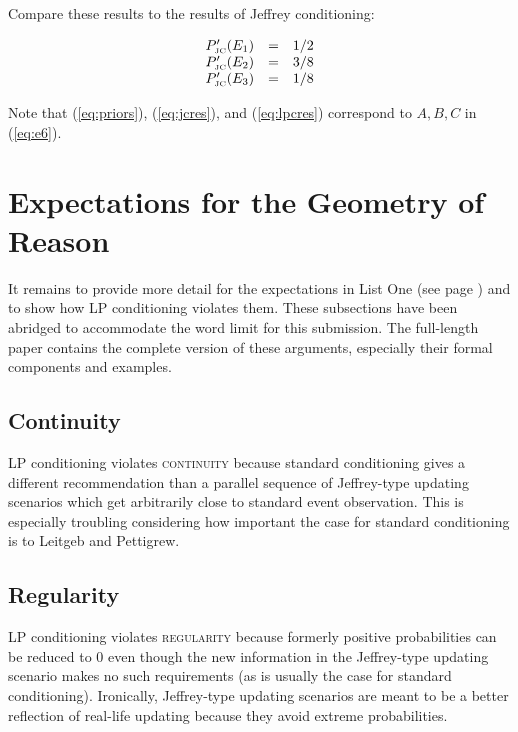 \documentclass[11pt]{article}
\begin{document}
Compare these results to the results of Jeffrey conditioning:

\begin{equation}
  \label{eq:jcres}
  \begin{array}{rcl}
    P'_{\mbox{\tiny JC}}(E_{1})&=&1/2 \\
    P'_{\mbox{\tiny JC}}(E_{2})&=&3/8 \\
    P'_{\mbox{\tiny JC}}(E_{3})&=&1/8
  \end{array}
\end{equation}

Note that (\ref{eq:priors}), (\ref{eq:jcres}), and (\ref{eq:lpcres})
correspond to $A,B,C$ in (\ref{eq:e6}).

\section{Expectations for the Geometry of Reason}
\label{fivex}

It remains to provide more detail for the expectations in List One
(see page \pageref{page:listone}) and to show how LP conditioning
violates them. These subsections have been abridged to accommodate the
word limit for this submission. The full-length paper contains the
complete version of these arguments, especially their formal
components and examples.

\subsection{Continuity}
\label{Continuity}

LP conditioning violates \textsc{continuity} because standard
conditioning gives a different recommendation than a parallel sequence
of Jeffrey-type updating scenarios which get arbitrarily close to
standard event observation. This is especially troubling considering
how important the case for standard conditioning is to Leitgeb and
Pettigrew.

\subsection{Regularity}
\label{Regularity}

LP conditioning violates \textsc{regularity} because formerly positive
probabilities can be reduced to $0$ even though the new information in
the Jeffrey-type updating scenario makes no such requirements (as is
usually the case for standard conditioning). Ironically, Jeffrey-type
updating scenarios are meant to be a better reflection of real-life
updating because they avoid extreme probabilities.
\end{document}
